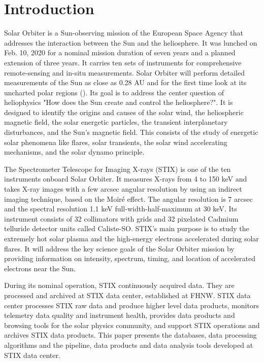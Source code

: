 \documentclass{aa}
\begin{document}
\section{Introduction}
Solar Orbiter is a Sun-observing mission of the European Space  Agency that 
addresses the interaction between the Sun and the heliosphere.
It was lunched on Feb. 10, 2020 for a nominal mission duration of seven years and a planned 
extension of
three years. It carries ten sets of instruments for comprehensive
remote-sensing and in-situ measurements. 
Solar Orbiter  will perform detailed measurements of the Sun as close as 0.28 AU and for the first time look at its uncharted polar regions (\cite{SolarOrbiter2020}).  
Its goal is to  address the center question of heliophysics  "How does the Sun create and control the heliosphere?".  It is designed to identify the origins and causes of the solar wind, the heliospheric magnetic field, the solar energetic particles, the transient interplanetary disturbances, and the Sun's magnetic field.
This consists of the study of energetic solar phenomena like flares,  solar transients,  the solar wind accelerating mechanisms, and the solar dynamo principle.  


The Spectrometer Telescope for Imaging X-rays (STIX) is one of the ten instruments onboard Solar Orbiter.  It measures X-rays from 4 to 150 keV and takes X-ray images with a few arcsec angular resolution by using an indirect imaging technique, based on the Moiré effect.  The angular resolution
is 7 arcsec and the spectral resolution 1.1 keV full-width-half-maximum at 30 keV.
Its instrument consists of 32 collimators with
grids and 32 pixelated Cadmium telluride  detector units called Caliste-SO.
STIX's main purpose is to study the extremely hot solar plasma and the high-energy electrons accelerated during solar flares.
It will address the key science goals of the Solar Orbiter mission by providing information on intensity, spectrum, timing, and location of accelerated electrons near the Sun. 

During its nominal operation, STIX continuously acquired data.  They are processed and archived at STIX data center, established at FHNW. STIX data center processes STIX raw data and produce higher level data products, monitors telemetry data quality and instrument health, provides data products and browsing tools for the solar physics community, and support STIX operations and archives STIX data products. This paper presents the databases, data processing algorithms and the pipeline, data products and data analysis tools developed at STIX data center. 
\end{document}
